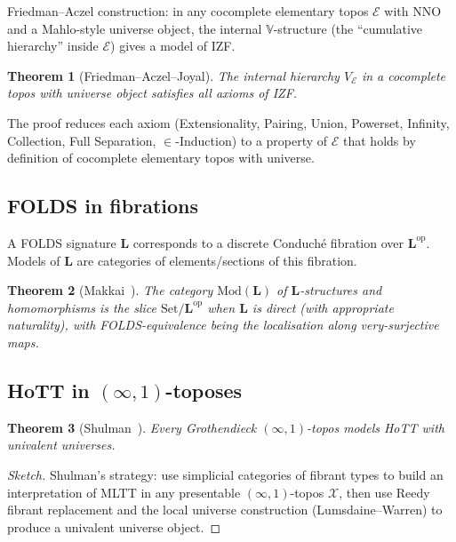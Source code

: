 \documentclass[12pt]{article}
\newtheorem{theorem}{Theorem}[section]
\theoremstyle{definition}
\theoremstyle{remark}
\begin{document}
Friedman--Aczel construction: in any cocomplete elementary topos $\mathcal{E}$ with NNO
and a Mahlo-style universe object, the internal $\mathbb{V}$-structure (the
``cumulative hierarchy'' inside $\mathcal{E}$) gives a model of IZF.

\begin{theorem}[Friedman--Aczel--Joyal]
The internal hierarchy $V_{\mathcal{E}}$ in a cocomplete topos with universe object
satisfies all axioms of IZF.
\end{theorem}

The proof reduces each axiom (Extensionality, Pairing, Union, Powerset, Infinity,
Collection, Full Separation, $\in$-Induction) to a property of $\mathcal{E}$ that holds
by definition of cocomplete elementary topos with universe.

\subsection{FOLDS in fibrations}

A FOLDS signature $\mathbf{L}$ corresponds to a discrete Conduch\'e fibration over
$\mathbf{L}^{\mathrm{op}}$. Models of $\mathbf{L}$ are categories of elements/sections of
this fibration.

\begin{theorem}[Makkai~\cite{Makkai1995}]
\label{thm:foldsfib}
The category $\mathrm{Mod}(\mathbf{L})$ of $\mathbf{L}$-structures and homomorphisms is
the slice $\mathrm{Set}/\mathbf{L}^{\mathrm{op}}$ when $\mathbf{L}$ is direct (with
appropriate naturality), with FOLDS-equivalence being the localisation along
very-surjective maps.
\end{theorem}

\subsection{HoTT in \texorpdfstring{$(\infty,1)$}{(infinity,1)}-toposes}

\begin{theorem}[Shulman~\cite{Shulman2019}]
\label{thm:shulman}
Every Grothendieck $(\infty,1)$-topos models HoTT with univalent universes.
\end{theorem}
\begin{proof}[Sketch]
Shulman's strategy: use simplicial categories of fibrant types to build an interpretation
of MLTT in any presentable $(\infty,1)$-topos $\mathcal{X}$, then use
Reedy fibrant replacement and the local universe construction (Lumsdaine--Warren) to
produce a univalent universe object.
\end{proof}
\end{document}
